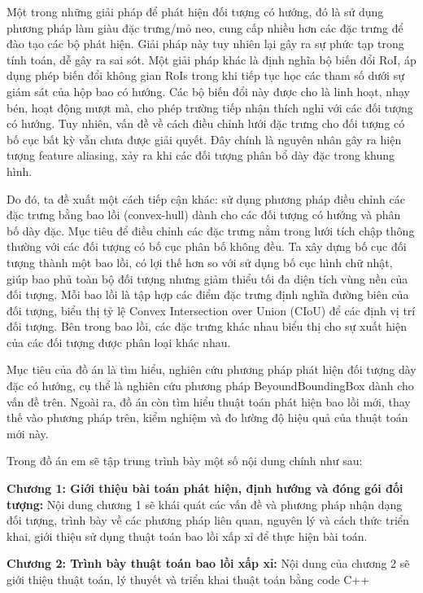 \documentclass[12pt,a4paper,openany,oneside]{report}
\begin{document}
Một trong những giải pháp để phát hiện đối tượng có hướng, đó là sử dụng phương pháp làm giàu đặc trưng/mỏ neo, cung cấp nhiều hơn các đặc trưng để đào tạo các bộ phát hiện. Giải pháp này tuy nhiên lại gây ra sự phức tạp trong tính toán, dễ gây ra sai sót. Một giải pháp khác là định nghĩa bộ biến đổi RoI, áp dụng phép biến đổi không gian RoIs trong khi tiếp tục học các tham số dưới sự giám sát của hộp bao có hướng. Các bộ biến đổi này được cho là linh hoạt, nhạy bén, hoạt động mượt mà, cho phép trường tiếp nhận thích nghi với các đối tượng có hướng. Tuy nhiên, vấn đề về cách điều chỉnh lưới đặc trưng cho đối tượng có bố cục bất kỳ vẫn chưa được giải quyết. Đây chính là nguyên nhân gây ra hiện tượng feature aliasing, xảy ra khi các đối tượng phân bổ dày đặc trong khung hình.


Do đó, ta đề xuất một cách tiếp cận khác: sử dụng phương pháp điều chỉnh các đặc trưng bằng bao lồi (convex-hull) dành cho các đối tượng có hướng và phân bố dày đặc. Mục tiêu để điều chỉnh các đặc trưng nằm trong lưới tích chập thông thường với các đối tượng có bố cục phân bố không đều. Ta xây dựng bố cục đối tượng thành một bao lồi, có lợi thế hơn so với sử dụng bố cục hình chữ nhật, giúp bao phủ toàn bộ đối tượng nhưng giảm thiểu tối đa diện tích vùng nền của đối tượng. Mỗi bao lồi là tập hợp các điểm đặc trưng định nghĩa đường biên của đối tượng, biểu thị tỷ lệ Convex Intersection over Union (CIoU) để các định vị trí đối tượng. Bên trong bao lồi, các đặc trưng khác nhau biểu thị cho sự xuất hiện của các đối tượng được phân loại khác nhau.


Mục tiêu của đồ án là tìm hiểu, nghiên cứu phương pháp phát hiện đối tượng dày đặc có hướng, cụ thể là nghiên cứu phương pháp BeyoundBoundingBox dành cho vấn đề trên. Ngoài ra, đồ án còn tìm hiểu thuật toán phát hiện bao lồi mới, thay thế vào phương pháp trên, kiểm nghiệm và đo lường độ hiệu quả của thuật toán mới này.


Trong đồ án em sẽ tập trung trình bày một số nội dung chính như sau:

\textbf{Chương 1: Giới thiệu bài toán phát hiện, định hướng và đóng gói đối tượng:}
Nội dung chương 1 sẽ khái quát các vấn đề và phương pháp nhận dạng đối tượng, trình bày về các phương pháp liên quan, nguyên lý và cách thức triển khai, giới thiệu sử dụng thuật toán bao lồi xấp xỉ để thực hiện bài toán.


\textbf{Chương 2: Trình bày thuật toán bao lồi xấp xỉ:}
Nội dung của chương 2 sẽ giới thiệu thuật toán, lý thuyết và triển khai thuật toán bằng code C++
\end{document}
